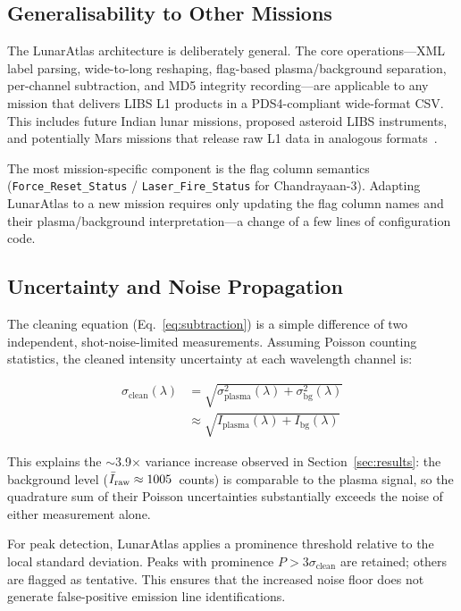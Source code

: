 \documentclass[a4paper,twocolumn,10pt]{article}
\begin{document}
\subsection{Generalisability to Other Missions}

The LunarAtlas architecture is deliberately general.  The core
operations---XML label parsing, wide-to-long reshaping, flag-based
plasma/background separation, per-channel subtraction, and MD5
integrity recording---are applicable to any mission that delivers LIBS
L1 products in a PDS4-compliant wide-format CSV.  This includes future
Indian lunar missions, proposed asteroid LIBS instruments, and
potentially Mars missions that release raw L1 data in analogous
formats~\cite{Saeidfirozeh2024}.

The most mission-specific component is the flag column semantics
(\texttt{Force\_Reset\_Status} / \texttt{Laser\_Fire\_Status} for
Chandrayaan-3).  Adapting LunarAtlas to a new mission requires only
updating the flag column names and their
plasma/background interpretation---a change of a few lines of
configuration code.

\subsection{Uncertainty and Noise Propagation}

The cleaning equation (Eq.~\ref{eq:subtraction}) is a simple
difference of two independent, shot-noise-limited measurements.
Assuming Poisson counting statistics, the cleaned intensity
uncertainty at each wavelength channel is:

\begin{equation}
\label{eq:uncertainty}
\begin{split}
\sigma_{\text{clean}}(\lambda) &=
  \sqrt{\sigma_{\text{plasma}}^2(\lambda)
  + \sigma_{\text{bg}}^2(\lambda)} \\
  &\approx \sqrt{I_{\text{plasma}}(\lambda)
  + I_{\text{bg}}(\lambda)}
\end{split}
\end{equation}

This explains the $\sim$3.9$\times$ variance increase observed in
Section~\ref{sec:results}: the background level ($\bar{I}_{\rm raw}
\approx 1005$~counts) is comparable to the plasma signal, so
the quadrature sum of their Poisson uncertainties substantially
exceeds the noise of either measurement alone.

For peak detection, LunarAtlas applies a prominence threshold
relative to the local standard deviation.  Peaks with prominence
$P > 3\sigma_{\text{clean}}$ are retained; others are flagged as
tentative.  This ensures that the increased noise floor does not
generate false-positive emission line identifications.
\end{document}
